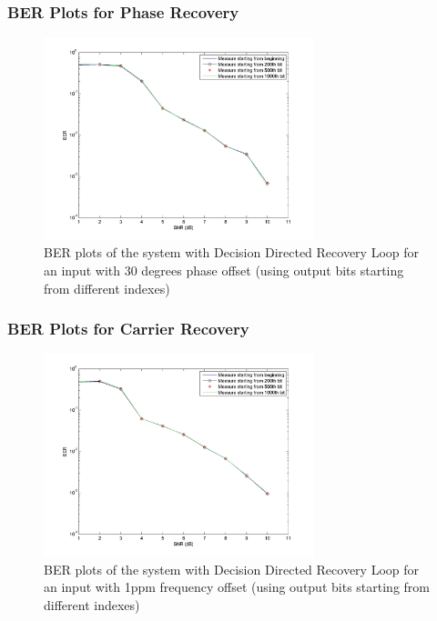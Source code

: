 \documentclass[]{article}
\begin{document}
\subsubsection{BER Plots for Phase Recovery}
\begin{figure}[H]
\centering
\hspace*{-2cm}\includegraphics[width=0.7\textwidth]{qpBERpo_ddr1.jpg}
\caption{BER plots of the system with Decision Directed Recovery Loop for an input with 30 degrees phase offset (using output bits starting from different indexes) \label{fig:ddrBERphase}}
\end{figure}

\subsubsection{BER Plots for Carrier Recovery}
\begin{figure}[H]
\centering
\hspace*{-2cm}\includegraphics[width=0.7\textwidth]{qpBERfo_ddr1.jpg}
\caption{BER plots of the system with Decision Directed Recovery Loop for an input with 1ppm frequency offset (using output bits starting from different indexes) \label{fig:ddrBERFreq1}}
\end{figure}
\end{document}
